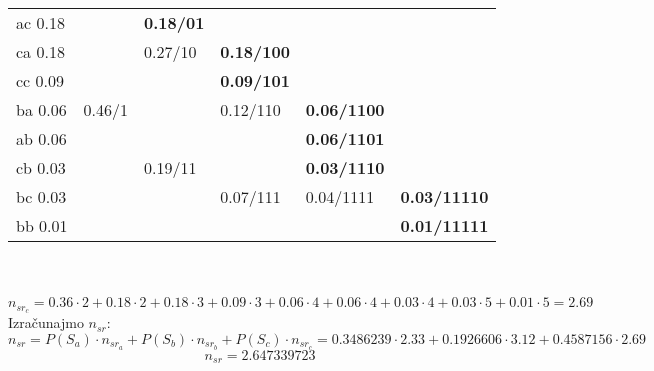 \documentclass[12pt]{article}
\begin{document}
\begin{enumerate}
\begin{tabular}{|l|l|l|lll}
ac 0.18 &        & \textbf{0.18/01} &                                        &                                         &                                          \\ \cline{1-4}
ca 0.18 &        & 0.27/10          & \multicolumn{1}{l|}{\textbf{0.18/100}} &                                         &                                          \\ \cline{1-1} \cline{4-4}
cc 0.09 &        &                  & \multicolumn{1}{l|}{\textbf{0.09/101}} &                                         &                                          \\ \cline{1-1} \cline{3-5}
ba 0.06 & 0.46/1 &                  & \multicolumn{1}{l|}{0.12/110}          & \multicolumn{1}{l|}{\textbf{0.06/1100}} &                                          \\ \cline{1-1} \cline{5-5}
ab 0.06 &        &                  & \multicolumn{1}{l|}{}                  & \multicolumn{1}{l|}{\textbf{0.06/1101}} &                                          \\ \cline{1-1} \cline{4-5}
cb 0.03 &        & 0.19/11          & \multicolumn{1}{l|}{}                  & \multicolumn{1}{l|}{\textbf{0.03/1110}} &                                          \\ \cline{1-1} \cline{5-6} 
bc 0.03 &        &                  & \multicolumn{1}{l|}{0.07/111}          & \multicolumn{1}{l|}{0.04/1111}          & \multicolumn{1}{l|}{\textbf{0.03/11110}} \\ \cline{1-1} \cline{6-6} 
bb 0.01 &        &                  & \multicolumn{1}{l|}{}                  & \multicolumn{1}{l|}{}                   & \multicolumn{1}{l|}{\textbf{0.01/11111}} \\ \hline
\end{tabular}
\\
\\
\begin{equation*}
    n_{sr_{c}} = 0.36 \cdot 2 + 0.18 \cdot 2 + 0.18 \cdot 3 + 0.09 \cdot 3 + 0.06 \cdot 4 + 0.06 \cdot 4 + 0.03 \cdot 4 + 0.03 \cdot 5 + 0.01 \cdot 5 = 2.69
\end{equation*}	
\newpage
Izračunajmo $n_{sr}$:
 \begin{equation*}
     n_{sr} = P(S_a) \cdot n_{sr_{a}} + P(S_b) \cdot n_{sr_{b}} + P(S_c) \cdot n_{sr_{c}} = 0.3486239 \cdot 2.33 + 0.1926606 \cdot 3.12 + 0.4587156 \cdot 2.69 
 \end{equation*}
 \begin{equation*}
     n_{sr} = 2.647339723    

\end{equation*}
\end{enumerate}
\end{document}
